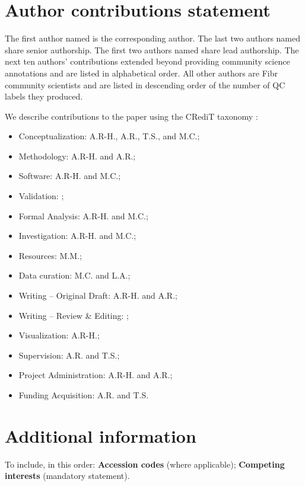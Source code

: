 \documentclass[fleqn,10pt]{wlscirep}
\begin{document}

\section*{Author contributions statement}

The first author named is the corresponding author.
The last two authors named share senior authorship.
The first two authors named share lead authorship.
The next ten authors' contributions extended beyond providing community science annotations and are listed in alphabetical order.
All other authors are Fibr community scientists and are listed in descending order of the number of QC labels they produced.


We describe contributions to the paper using the CRediT taxonomy \cite{brand2015-vd}:
\begin{itemize}
    \item Conceptualization: A.R-H., A.R., T.S., and M.C.;
    \item Methodology: A.R-H. and A.R.;
    \item Software: A.R-H. and M.C.;
    \item Validation: ;
    \item Formal Analysis: A.R-H. and M.C.;
    \item Investigation: A.R-H. and M.C.;
    \item Resources: M.M.;
    \item Data curation: M.C. and L.A.;
    \item Writing – Original Draft: A.R-H. and A.R.;
    \item Writing – Review \& Editing: ;
    \item Visualization: A.R-H.;
    \item Supervision: A.R. and T.S.;
    \item Project Administration: A.R-H. and A.R.;
    \item Funding Acquisition: A.R. and T.S.
\end{itemize}

\section*{Additional information}

To include, in this order: \textbf{Accession codes} (where applicable); \textbf{Competing interests} (mandatory statement). 
\end{document}
